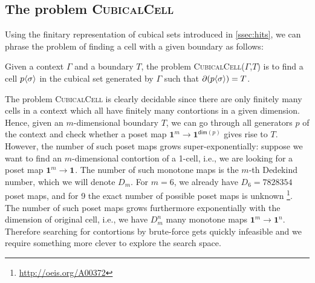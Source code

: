 \documentclass{llncs}
\newcommand{\myproblem}[1]{\textsc{{#1}}}
\newcommand{\pint}[1]{\mathbf{1}^{#1}}
\renewcommand{\dim}[1]{\mathsf{dim}({#1})}
\newcommand{\ctxtdim}[1]{|{#1}|}
\newcommand{\cont}[2]{\ensuremath{ \ifthenelse{\equal{#2}{}}{#1}{{#1}\langle{#2}\rangle}} }
\newcommand{\boundary}[1]{\partial({#1})}
\begin{document}
\subsection{The problem \myproblem{CubicalCell}}
\label{ssec:cubicalcell}

Using the finitary representation of cubical sets introduced in \autoref{ssec:hits}, we can phrase the problem of
finding a cell with a given boundary as follows:

\begin{definition}
  Given a context $\Gamma$ and a boundary $T$, the problem
  \myproblem{CubicalCell}($\Gamma$,$T$) is to find a cell $\cont{p}{\sigma}$ in
  the cubical set generated by $\Gamma$ such that
  $\boundary{\cont{p}{\sigma}} = T$.
\end{definition}

The problem \myproblem{CubicalCell} is clearly decidable since there are
only finitely many cells in a context which all have finitely many contortions
in a given dimension.
Hence, given an $m$-dimensional boundary $T$, we can go through all generators $p$
of the context and check whether a poset map $\pint{m} \to \pint{\dim{p}}$ gives
rise to $T$. However, the number of such poset maps 
grows super-exponentially: suppose we want to find an
$m$-dimensional contortion of a 1-cell, i.e., we are looking for a poset map
$\pint{m} \to \pint{}$. The number of such monotone maps is the $m$-th Dedekind
number, which we will denote $D_m$. For $m = 6$, we already have $D_6 = 7828354$
poset maps, and for 9 the exact number of possible poset maps is unknown
\footnote{\url{http://oeis.org/A00372}}. The number of such poset maps grows
furthermore exponentially with the dimension of original cell,
i.e., we have $D_m^n$ many monotone maps $\pint{m} \to \pint{n}$. 
Therefore searching for contortions by brute-force gets quickly infeasible and we
require something more clever to explore the search space.


\end{document}
